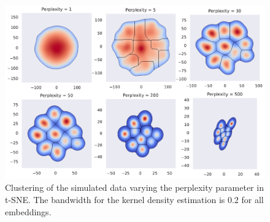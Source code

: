 \documentclass[a4paper]{memoir}
\theoremstyle{plain}
\theoremstyle{definition}
\theoremstyle{remark}
\begin{document}
\begin{figure}[tb]
        \centering
        \includegraphics[width=1\linewidth]{./code/figures/perplexity_tuning_simulated.pdf}
        \caption{Clustering of the simulated data varying the perplexity parameter in t-SNE.
        The bandwidth for the kernel density estimation is 0.2 for all embeddings.}
        \label{fig:perplexity_tuning_simulated}
\end{figure}




\newpage
\printbibliography
\end{document}

